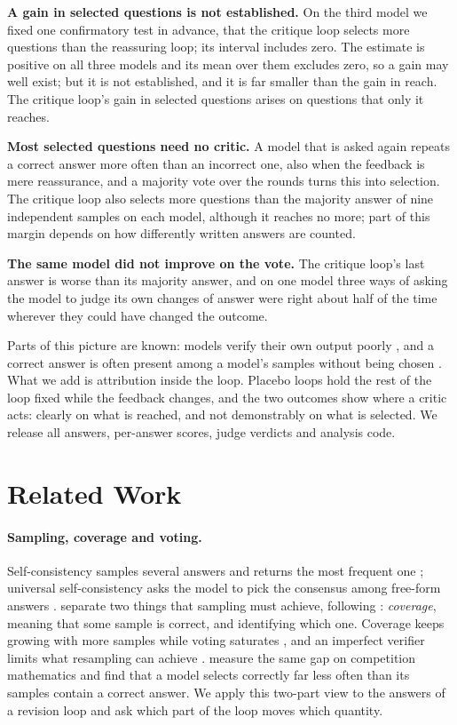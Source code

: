 \documentclass[11pt]{article}
\begin{document}
\textbf{A gain in selected questions is not established.}
On the third model we fixed one confirmatory test in advance, that the critique loop selects more questions than the reassuring loop; its interval includes zero.
The estimate is positive on all three models and its mean over them excludes zero, so a gain may well exist; but it is not established, and it is far smaller than the gain in reach.
The critique loop's gain in selected questions arises on questions that only it reaches.

\textbf{Most selected questions need no critic.}
A model that is asked again repeats a correct answer more often than an incorrect one, also when the feedback is mere reassurance, and a majority vote over the rounds turns this into selection.
The critique loop also selects more questions than the majority answer of nine independent samples on each model, although it reaches no more; part of this margin depends on how differently written answers are counted.

\textbf{The same model did not improve on the vote.}
The critique loop's last answer is worse than its majority answer, and on one model three ways of asking the model to judge its own changes of answer were right about half of the time wherever they could have changed the outcome.

Parts of this picture are known: models verify their own output poorly \citep{huang2024cannot,stechly2024selfverification,song2024mindgap}, and a correct answer is often present among a model's samples without being chosen \citep{brown2024monkeys,jain2026cliff}.
What we add is attribution inside the loop.
Placebo loops hold the rest of the loop fixed while the feedback changes, and the two outcomes show where a critic acts: clearly on what is reached, and not demonstrably on what is selected.
We release all answers, per-answer scores, judge verdicts and analysis code.

\section{Related Work}

\paragraph{Sampling, coverage and voting.}
Self-consistency samples several answers and returns the most frequent one \citep{wang2023selfconsistency,aggarwal2023adaptive}; universal self-consistency asks the model to pick the consensus among free-form answers \citep{chen2023usc}.
\citet{brown2024monkeys} separate two things that sampling must achieve, following \citet{chen2021codex}: \emph{coverage}, meaning that some sample is correct, and identifying which one.
Coverage keeps growing with more samples while voting saturates \citep{chen2024morecalls}, and an imperfect verifier limits what resampling can achieve \citep{stroebl2024flaws}.
\citet{jain2026cliff} measure the same gap on competition mathematics and find that a model selects correctly far less often than its samples contain a correct answer.
We apply this two-part view to the answers of a revision loop and ask which part of the loop moves which quantity.
\end{document}
